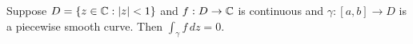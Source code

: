 \documentclass{homework}
\begin{document}
                                                                                                                                             \begin{problem}
                                                                                                                                               Suppose $D = \{ z \in \mathbb{C} : \left|z\right| < 1 \}$ and $f : D \to \mathbb{C}$ is
                                                                                                                                                 continuous and $\gamma : [a,b] \to D$ is a piecewise smooth curve.
                                                                                                                                                   Then $\displaystyle\int_\gamma f\, dz = 0$.
                                                                                                                                                   \end{problem}
\end{document}

